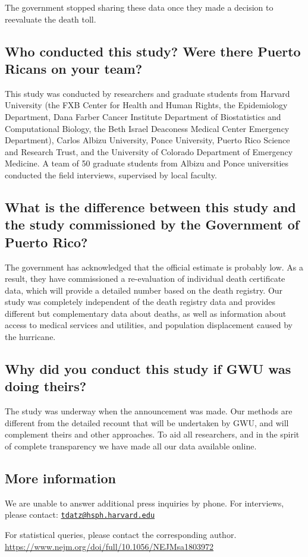 \documentclass[]{article}
\begin{document}
The government stopped sharing these data once they made a decision to
reevaluate the death toll.

\subsection{Who conducted this study? Were there Puerto Ricans on your
team?}\label{who-conducted-this-study-were-there-puerto-ricans-on-your-team}

This study was conducted by researchers and graduate students from
Harvard University (the FXB Center for Health and Human Rights, the
Epidemiology Department, Dana Farber Cancer Institute Department of
Biostatistics and Computational Biology, the Beth Israel Deaconess
Medical Center Emergency Department), Carlos Albizu University, Ponce
University, Puerto Rico Science and Research Trust, and the University
of Colorado Department of Emergency Medicine. A team of 50 graduate
students from Albizu and Ponce universities conducted the field
interviews, supervised by local faculty.

\subsection{What is the difference between this study and the study
commissioned by the Government of Puerto
Rico?}\label{what-is-the-difference-between-this-study-and-the-study-commissioned-by-the-government-of-puerto-rico}

The government has acknowledged that the official estimate is probably
low. As a result, they have commissioned a re-evaluation of individual
death certificate data, which will provide a detailed number based on
the death registry. Our study was completely independent of the death
registry data and provides different but complementary data about
deaths, as well as information about access to medical services and
utilities, and population displacement caused by the hurricane.

\subsection{Why did you conduct this study if GWU was doing
theirs?}\label{why-did-you-conduct-this-study-if-gwu-was-doing-theirs}

The study was underway when the announcement was made. Our methods are
different from the detailed recount that will be undertaken by GWU, and
will complement theirs and other approaches. To aid all researchers, and
in the spirit of complete transparency we have made all our data
available online.

\subsection{More information}\label{more-information}

We are unable to answer additional press inquiries by phone. For
interviews, please contact:
\href{mailto:tdatz@hsph.harvard.edu}{\nolinkurl{tdatz@hsph.harvard.edu}}

For statistical queries, please contact the corresponding author.
\url{https://www.nejm.org/doi/full/10.1056/NEJMsa1803972}
\end{document}
